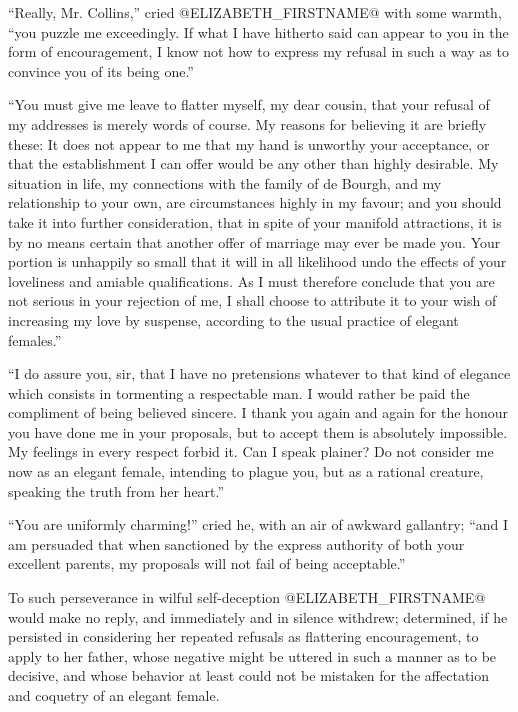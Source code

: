 ``Really, Mr. Collins,'' cried @ELIZABETH_FIRSTNAME@ with some warmth, ``you puzzle me
exceedingly. If what I have hitherto said can appear to you in the form
of encouragement, I know not how to express my refusal in such a way as
to convince you of its being one.''

``You must give me leave to flatter myself, my dear cousin, that your
refusal of my addresses is merely words of course. My reasons for
believing it are briefly these: It does not appear to me that my hand is
unworthy your acceptance, or that the establishment I can offer would
be any other than highly desirable. My situation in life, my connections
with the family of de Bourgh, and my relationship to your own, are
circumstances highly in my favour; and you should take it into further
consideration, that in spite of your manifold attractions, it is by no
means certain that another offer of marriage may ever be made you. Your
portion is unhappily so small that it will in all likelihood undo
the effects of your loveliness and amiable qualifications. As I must
therefore conclude that you are not serious in your rejection of me,
I shall choose to attribute it to your wish of increasing my love by
suspense, according to the usual practice of elegant females.''

``I do assure you, sir, that I have no pretensions whatever to that kind
of elegance which consists in tormenting a respectable man. I would
rather be paid the compliment of being believed sincere. I thank you
again and again for the honour you have done me in your proposals, but
to accept them is absolutely impossible. My feelings in every respect
forbid it. Can I speak plainer? Do not consider me now as an elegant
female, intending to plague you, but as a rational creature, speaking
the truth from her heart.''

``You are uniformly charming!'' cried he, with an air of awkward
gallantry; ``and I am persuaded that when sanctioned by the express
authority of both your excellent parents, my proposals will not fail of
being acceptable.''

To such perseverance in wilful self-deception @ELIZABETH_FIRSTNAME@ would make
no reply, and immediately and in silence withdrew; determined, if
he persisted in considering her repeated refusals as flattering
encouragement, to apply to her father, whose negative might be uttered
in such a manner as to be decisive, and whose behavior at least could
not be mistaken for the affectation and coquetry of an elegant female.



